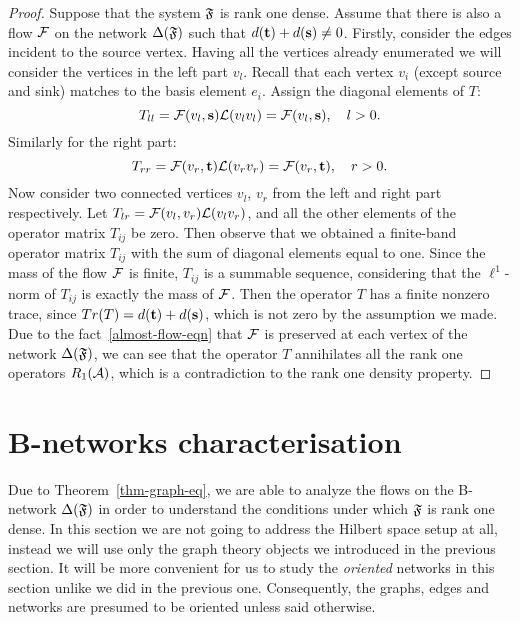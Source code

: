 \documentclass[12pt,oneside,a4paper]{amsart}
\begin{document}
\begin{proof}
        Suppose that the system $\fsys$ is rank one dense.
        Assume that there is also a flow $\flow$ on the network $\net(\fsys)$ such that $d(\sink) + d(\source) \neq 0$.
        Firstly, consider the edges incident to the source vertex.
        Having all the vertices already enumerated we will consider the vertices in the left part $v_{l}$.
        Recall that each vertex $v_i$ (except source and sink) matches to the basis element $e_i$.
        Assign the diagonal elements of $T$:
        \[
          T_{ll} = \flow(v_l, \source) \len(v_l v_l) = \flow(v_l, \source), \quad l > 0.
        \]
        Similarly for the right part:
        \[
          T_{rr} = \flow(v_r, \sink) \len(v_r v_r) = \flow(v_r, \sink), \quad r > 0.
        \]
        Now consider two connected vertices $v_l$, $v_r$ from the left and right part respectively.
        Let $T_{lr} = \flow(v_l, v_r) \len(v_l  v_r)$,
        and all the other elements of the operator matrix $T_{ij}$ be zero.
        Then observe that we obtained a finite-band operator matrix $T_{ij}$ with the sum of diagonal elements equal to one.
        Since the mass of the flow $\flow$ is finite, $T_{ij}$ is a summable sequence, considering that
          the $\ell^1$-norm of $T_{ij}$ is exactly the mass of $\flow$.
        Then the operator $T$ has a finite nonzero trace, since $Tr(T) = d(\sink) + d(\source)$, which is not zero
          by the assumption we made.
        Due to the fact~\eqref{almost-flow-eqn} that $\flow$ is preserved at each vertex of the network $\net(\fsys)$,
          we can see that the operator $T$ annihilates all the rank one operators $R_1(\cal{A})$,
          which is a contradiction to the rank one density property.
      \end{proof}

  \bigskip
  \section{B-networks characterisation}
    Due to Theorem~\ref{thm-graph-eq}, we are able to analyze the flows on the B-network
      $\net(\fsys)$ in order to understand the conditions under which $\fsys$ is rank one dense.
    In this section we are not going to address the Hilbert space setup at all,
      instead we will use only the graph theory objects we introduced in the previous section.
    It will be more convenient for us to study the \emph{oriented} networks in this section unlike we
      did in the previous one.
    Consequently, the graphs, edges and networks are presumed to be oriented unless said otherwise.
\end{document}
